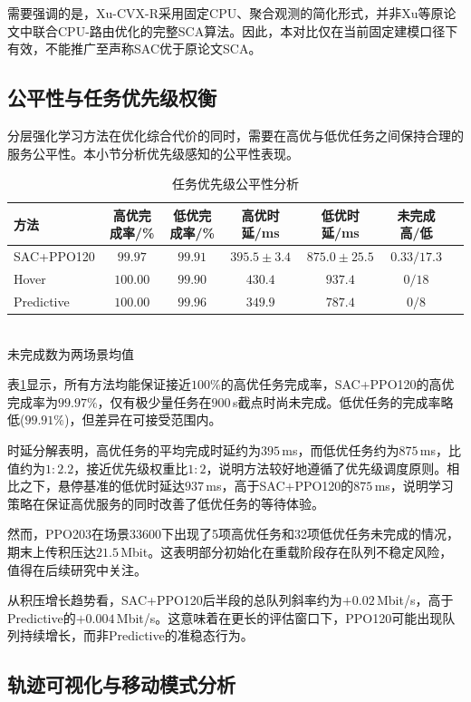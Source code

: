 需要强调的是，Xu-CVX-R采用固定CPU、聚合观测的简化形式，并非Xu等原论文中联合CPU-路由优化的完整SCA算法。因此，本对比仅在当前固定建模口径下有效，不能推广至声称SAC优于原论文SCA。

\subsection{公平性与任务优先级权衡}
\label{ssec:fairness}

分层强化学习方法在优化综合代价的同时，需要在高优与低优任务之间保持合理的服务公平性。本小节分析优先级感知的公平性表现。

\begin{table}[htbp]
\centering
\caption{任务优先级公平性分析}
\label{tab:priority_fairness}
\begin{tabular}{lcccccc}
\toprule
方法 & 高优完成率/\% & 低优完成率/\% & 高优时延/ms & 低优时延/ms & 未完成高/低 \\
\midrule
SAC+PPO120 & $99.97$ & $99.91$ & $395.5\pm3.4$ & $875.0\pm25.5$ & $0.33/17.3$ \\
Hover & $100.00$ & $99.90$ & $430.4$ & $937.4$ & $0/18$ \\
Predictive & $100.00$ & $99.96$ & $349.9$ & $787.4$ & $0/8$ \\
\bottomrule
\end{tabular}
\\[3pt]
\scriptsize 未完成数为两场景均值
\end{table}

表\ref{tab:priority_fairness}显示，所有方法均能保证接近$100\%$的高优任务完成率，SAC+PPO120的高优完成率为$99.97\%$，仅有极少量任务在$900\,$s截点时尚未完成。低优任务的完成率略低($99.91\%$)，但差异在可接受范围内。

时延分解表明，高优任务的平均完成时延约为$395\,$ms，而低优任务约为$875\,$ms，比值约为$1:2.2$，接近优先级权重比$1:2$，说明方法较好地遵循了优先级调度原则。相比之下，悬停基准的低优时延达$937\,$ms，高于SAC+PPO120的$875\,$ms，说明学习策略在保证高优服务的同时改善了低优任务的等待体验。

然而，PPO203在场景33600下出现了5项高优任务和32项低优任务未完成的情况，期末上传积压达$21.5\,$Mbit。这表明部分初始化在重载阶段存在队列不稳定风险，值得在后续研究中关注。

从积压增长趋势看，SAC+PPO120后半段的总队列斜率约为$+0.02\,$Mbit/s，高于Predictive的$+0.004\,$Mbit/s。这意味着在更长的评估窗口下，PPO120可能出现队列持续增长，而非Predictive的准稳态行为。

\subsection{轨迹可视化与移动模式分析}
\label{ssec:trajectory}

